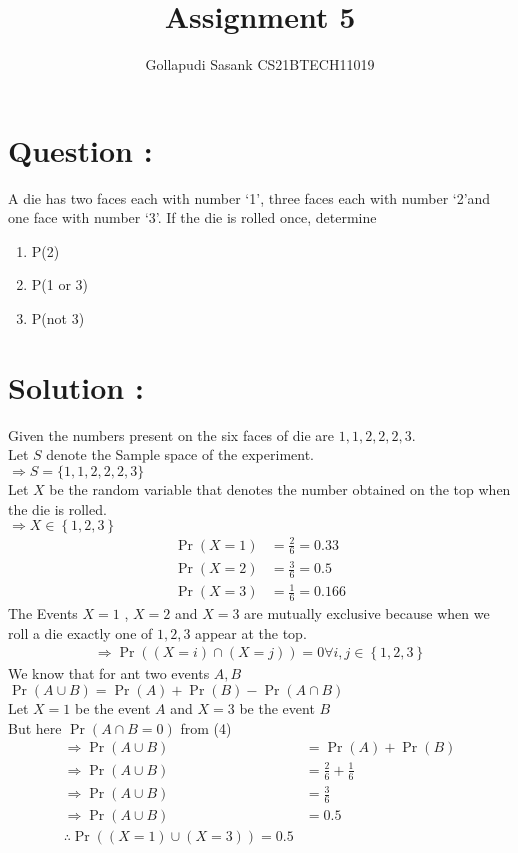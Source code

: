 \documentclass[twocolumn,12pt]{article}
\title{Assignment 5}
\author{Gollapudi Sasank CS21BTECH11019}
\providecommand{\pr}[1]{\ensuremath{\Pr\left(#1\right)}}
\providecommand{\cbrak}[1]{\ensuremath{\left\{#1\right\}}}
\begin{document}
\maketitle
\section*{Question : }
A die has two faces each with number \lq1\rq, three faces each with number \lq2\rq and one face with number \lq3\rq. If the die is rolled once, determine
\begin{enumerate}
\item P(2)
\item P(1 or 3)
\item P(not 3)
\end{enumerate}
\section*{Solution : }
Given the numbers present on the six faces of die are $ 1,1,2,2,2,3 $.\\
Let $S$ denote the Sample space of the experiment.\\
$\Rightarrow S = \{1,1,2,2,2,3\}$ \\
Let $X$ be the random variable that denotes the number obtained on the top when the die is rolled.\\
$\Rightarrow X \in \cbrak{1,2,3}$\\
\begin{align}
\pr{X=1} &= \frac{2}{6} = 0.33 \\
\pr{X=2} &= \frac{3}{6} = 0.5 \\
\pr{X=3} &= \frac{1}{6} = 0.166 
\end{align}
The Events $ X = 1 $ , $ X = 2 $ and $ X = 3 $ are mutually exclusive because when we roll a die exactly one of $ 1,2,3 $ appear at the top.
\begin{align}
\Rightarrow \pr{(X=i) \cap (X=j)} = 0\forall i,j \in \cbrak{1,2,3}
\end{align}
We know that for ant two events $ A,B$ \\
$ \pr{A \cup B} = \pr{A} + \pr{B} - \pr{A \cap B} $ \\
Let $ X=1 $ be the event $A$ and $X=3$ be the event $B$ \\
But here $\pr{A \cap B = 0} $ from (4)
\begin{align}
\Rightarrow \pr{A \cup B} &= \pr{A}+\pr{B} \\
\Rightarrow \pr{A \cup B}  &= \frac{2}{6} + \frac{1}{6} \\
\Rightarrow \pr{A \cup B} &= \frac{3}{6} \\
\Rightarrow \pr{A \cup B} &= 0.5 \\
\therefore \pr{(X=1) \cup (X=3)} = 0.5
\end{align}
\end{document}
